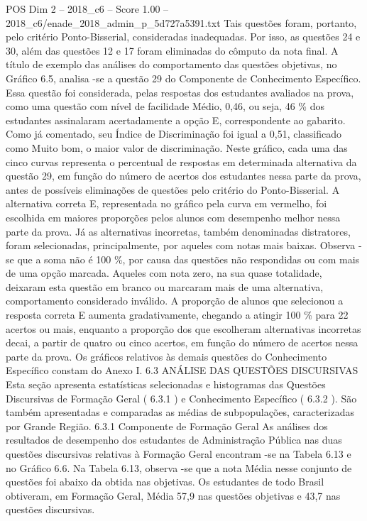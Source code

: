 \begin{textsample}{POS Dim 2 – 2018\_c6 – Score 1.00 – 2018\_c6/enade\_2018\_admin\_p\_5d727a5391.txt}
Tais questões foram, portanto, pelo critério Ponto-Bisserial, consideradas inadequadas.
Por isso, as questões 24 e 30, além das questões 12 e 17 foram eliminadas do cômputo da nota final.
A título de exemplo das análises do comportamento das questões objetivas, no Gráfico 6.5, analisa -se a questão 29 do Componente de Conhecimento Específico.
Essa questão foi considerada, pelas respostas dos estudantes avaliados na prova, como uma questão com nível de facilidade Médio, 0,46, ou seja, 46 \% dos estudantes assinalaram acertadamente a opção E, correspondente ao gabarito.
Como já comentado, seu Índice de Discriminação foi igual a 0,51, classificado como Muito bom, o maior valor de discriminação.
Neste gráfico, cada uma das cinco curvas representa o percentual de respostas em determinada alternativa da questão 29, em função do número de acertos dos estudantes nessa parte da prova, antes de possíveis eliminações de questões pelo critério do Ponto-Bisserial.
A alternativa correta E, representada no gráfico pela curva em vermelho, foi escolhida em maiores proporções pelos alunos com desempenho melhor nessa parte da prova.
Já as alternativas incorretas, também denominadas distratores, foram selecionadas, principalmente, por aqueles com notas mais baixas.
Observa -se que a soma não é 100 \%, por causa das questões não respondidas ou com mais de uma opção marcada.
Aqueles com nota zero, na sua quase totalidade, deixaram esta questão em branco ou marcaram mais de uma alternativa, comportamento considerado inválido.
A proporção de alunos que selecionou a resposta correta E aumenta gradativamente, chegando a atingir 100 \% para 22 acertos ou mais, enquanto a proporção dos que escolheram alternativas incorretas decai, a partir de quatro ou cinco acertos, em função do número de acertos nessa parte da prova.
Os gráficos relativos às demais questões do Conhecimento Específico constam do Anexo I. 6.3 ANÁLISE DAS QUESTÕES DISCURSIVAS Esta seção apresenta estatísticas selecionadas e histogramas das Questões Discursivas de Formação Geral ( 6.3.1 ) e Conhecimento Específico ( 6.3.2 ).
São também apresentadas e comparadas as médias de subpopulações, caracterizadas por Grande Região. 6.3.1 Componente de Formação Geral As análises dos resultados de desempenho dos estudantes de Administração Pública nas duas questões discursivas relativas à Formação Geral encontram -se na Tabela 6.13 e no Gráfico 6.6.
Na Tabela 6.13, observa -se que a nota Média nesse conjunto de questões foi abaixo da obtida nas objetivas.
Os estudantes de todo Brasil obtiveram, em Formação Geral, Média 57,9 nas questões objetivas e 43,7 nas questões discursivas.

\end{textsample}
